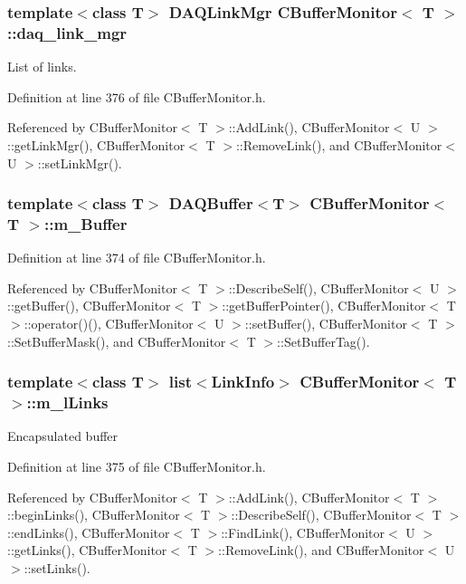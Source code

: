 \subsubsection{\setlength{\rightskip}{0pt plus 5cm}template$<$class T$>$ DAQLink\-Mgr CBuffer\-Monitor$<$ T $>$::daq\_\-link\_\-mgr\hspace{0.3cm}{\tt  [private]}}\label{classCBufferMonitor_o2}


List of links. 

Definition at line 376 of file CBuffer\-Monitor.h.

Referenced by CBuffer\-Monitor$<$ T $>$::Add\-Link(), CBuffer\-Monitor$<$ U $>$::get\-Link\-Mgr(), CBuffer\-Monitor$<$ T $>$::Remove\-Link(), and CBuffer\-Monitor$<$ U $>$::set\-Link\-Mgr().
\subsubsection{\setlength{\rightskip}{0pt plus 5cm}template$<$class T$>$ DAQBuffer$<$T$>$ CBuffer\-Monitor$<$ T $>$::m\_\-Buffer\hspace{0.3cm}{\tt  [private]}}\label{classCBufferMonitor_o0}




Definition at line 374 of file CBuffer\-Monitor.h.

Referenced by CBuffer\-Monitor$<$ T $>$::Describe\-Self(), CBuffer\-Monitor$<$ U $>$::get\-Buffer(), CBuffer\-Monitor$<$ T $>$::get\-Buffer\-Pointer(), CBuffer\-Monitor$<$ T $>$::operator()(), CBuffer\-Monitor$<$ U $>$::set\-Buffer(), CBuffer\-Monitor$<$ T $>$::Set\-Buffer\-Mask(), and CBuffer\-Monitor$<$ T $>$::Set\-Buffer\-Tag().
\subsubsection{\setlength{\rightskip}{0pt plus 5cm}template$<$class T$>$ list$<${\bf Link\-Info}$>$ CBuffer\-Monitor$<$ T $>$::m\_\-l\-Links\hspace{0.3cm}{\tt  [private]}}\label{classCBufferMonitor_o1}


Encapsulated buffer 

Definition at line 375 of file CBuffer\-Monitor.h.

Referenced by CBuffer\-Monitor$<$ T $>$::Add\-Link(), CBuffer\-Monitor$<$ T $>$::begin\-Links(), CBuffer\-Monitor$<$ T $>$::Describe\-Self(), CBuffer\-Monitor$<$ T $>$::end\-Links(), CBuffer\-Monitor$<$ T $>$::Find\-Link(), CBuffer\-Monitor$<$ U $>$::get\-Links(), CBuffer\-Monitor$<$ T $>$::Remove\-Link(), and CBuffer\-Monitor$<$ U $>$::set\-Links().
